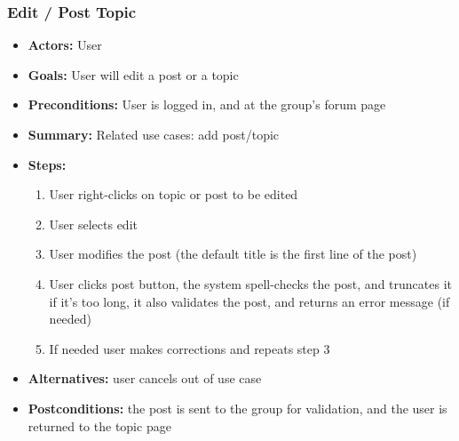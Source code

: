 			\subsubsection{Edit / Post Topic}
			\begin{itemize}
				\item{\textbf{Actors:} User}
				\item{\textbf{Goals:} User will edit a post or a topic}
				\item{\textbf{Preconditions:} User is logged in, and at the group's forum page}
				\item{\textbf{Summary:} Related use cases: add post/topic}
				\item{\textbf{Steps:}
				\begin{enumerate}
					\item{User right-clicks on topic or post to be edited}
					\item{User selects edit}
					\item{User modifies the post (the default title is the first line of the post)}
					\item{User clicks post button, the system spell-checks the post, and truncates it if it's too long, it also validates the post, and returns an error message (if needed)}
					\item{If needed user makes corrections and repeats step 3}
				\end{enumerate}
				}
				\item{\textbf{Alternatives:} user cancels out of use case}
				\item{\textbf{Postconditions:} the post is sent to the group for validation, and the user is returned to the topic page}
			\end{itemize}